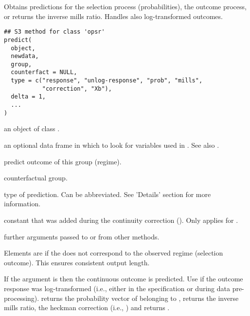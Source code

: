 %
\begin{Description}
Obtains predictions for the selection process (probabilities), the outcome process,
or returns the inverse mills ratio. Handles also log-transformed outcomes.
\end{Description}
%
\begin{Usage}
\begin{verbatim}
## S3 method for class 'opsr'
predict(
  object,
  newdata,
  group,
  counterfact = NULL,
  type = c("response", "unlog-response", "prob", "mills",
           "correction", "Xb"),
  delta = 1,
  ...
)
\end{verbatim}
\end{Usage}
%
\begin{Arguments}
\begin{ldescription}
\item[\code{object}] an object of class .

\item[\code{newdata}] an optional data frame in which to look for variables used in
. See also .

\item[\code{group}] predict outcome of this group (regime).

\item[\code{counterfact}] counterfactual group.

\item[\code{type}] type of prediction. Can be abbreviated. See 'Details' section for
more information.

\item[\code{delta}] constant that was added during the continuity correction
(). Only applies for .

\item[\code{...}] further arguments passed to or from other methods.
\end{ldescription}
\end{Arguments}
%
\begin{Details}
Elements are  if the  does not correspond to the observed
regime (selection outcome). This ensures consistent output length.

If the  argument is  then the continuous outcome is predicted.
Use  if the outcome response was log-transformed (i.e., either
in the  specification or during data pre-processing).
 returns the probability vector of belonging to , 
returns the inverse mills ratio,  the heckman correction (i.e.,
) and  returns .
\end{Details}
